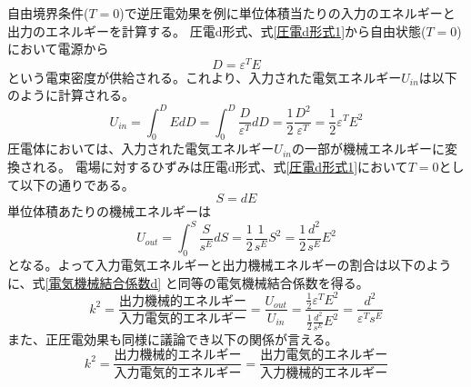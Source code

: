 \documentclass[dvipdfmx,12pt,a4paper]{jreport}
\begin{document}
			自由境界条件($T=0$)で逆圧電効果を例に単位体積当たりの入力のエネルギーと出力のエネルギーを計算する。
			圧電d形式、式\ref{圧電d形式1}から自由状態($T=0$)において電源から
			\begin{equation}
				D=\varepsilon^T E
			\end{equation}
			という電束密度が供給される。これより、入力された電気エネルギー$U_{in}$は以下のように計算される。
			\begin{equation}
				U_{in} = \int^{D}_0 E dD = \int^{D}_0 \frac{D}{\varepsilon^T} dD  
				= \frac{1}{2}\frac{D^2}{\varepsilon^T}
				= \frac{1}{2}\varepsilon^T E^2 
			\end{equation}
			圧電体においては、入力された電気エネルギー$U_{in}$の一部が機械エネルギーに変換される。
			電場に対するひずみは圧電d形式、式\ref{圧電d形式1}において$T=0$として以下の通りである。
			\begin{equation}
				S = d E
			\end{equation}
			単位体積あたりの機械エネルギーは
			\begin{equation}
				U_{out} = \int^S_0 \frac{S}{s^E} d S = \frac{1}{2} \frac{1}{s^E}S^2 
				= \frac{1}{2}\frac{d^2}{s^E}E^2
			\end{equation}
			となる。よって入力電気エネルギーと出力機械エネルギーの割合は以下のように、式\ref{電気機械結合係数d}
			と同等の電気機械結合係数を得る。
			\begin{equation}
				k^2 = \frac{\mbox{出力機械的エネルギー}}{\mbox{入力電気的エネルギー}}
				= \frac{U_{out}}{U_{in}} = \frac{\frac{1}{2}\varepsilon^T E^2}{\frac{1}{2}\frac{d^2}{s^E}E^2}
				= \frac{d^2}{\varepsilon^T s^E}
			\end{equation}
			また、正圧電効果も同様に議論でき以下の関係が言える。
			\begin{equation}
				k^2=\frac{\mbox{出力機械的エネルギー}}{\mbox{入力電気的エネルギー}}=
				\frac{\mbox{出力電気的エネルギー}}{\mbox{入力機械的エネルギー}}
				\label{電気機械結合係数の定義}
			\end{equation}
\end{document}

